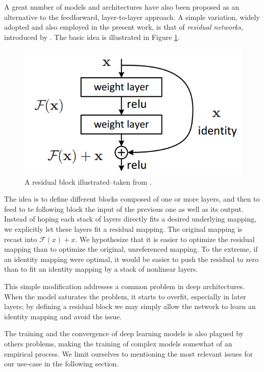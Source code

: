 A great number of models and architectures have also been proposed as an alternative to the feedforward, layer-to-layer approach. A simple variation, widely adopted and also employed in the present work, is that of \emph{residual networks}, introduced by \cite{DBLP:journals/corr/HeZRS15}. The basic idea is illustrated in Figure \ref{fig:resnet}.

\begin{figure}
    \centering
    \includegraphics[scale=0.50]{gfx/ch2/residual.png}
    \caption[A residual block]{A residual block illustrated--taken from \cite{DBLP:journals/corr/HeZRS15}.}
    \label{fig:resnet}
\end{figure}

The idea is to define different blocks composed of one or more layers, and then to feed to te following block the input of the previous one as well as its output. Instead of hoping each stack of layers directly fits a desired underlying mapping, we explicitly let these layers fit a residual mapping. The original mapping is recast into $\mathcal{F}(x) + x$. We hypothesize that it is easier to optimize the residual mapping than to optimize the original, unreferenced mapping. To the extreme, if an identity mapping were optimal, it would be easier to push the residual to zero than to fit an identity mapping by a stack of nonlinear layers. 

This simple modification addresses a common problem in deep architectures. When the model saturates the problem, it starts to overfit, especially in later layers; by defining a residual block we may simply allow the network to learn an identity mapping and avoid the issue.

The training and the convergence of deep learning models is also plagued by others problems, making the training of complex models somewhat of an empirical process. We limit ourselves to mentioning the most relevant issues for our use-case in the following section.

